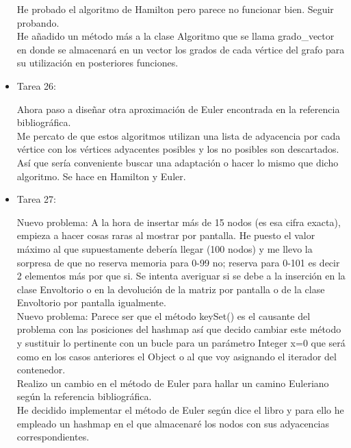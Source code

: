 \begin{itemize}
He probado el algoritmo de Hamilton pero parece no funcionar bien. Seguir probando.\\

He añadido un método más a la clase Algoritmo que se llama grado\_vector en donde se almacenará en un vector los grados de cada vértice del grafo para su utilización en posteriores funciones.\\

\item Tarea 26:

Ahora paso a diseñar otra aproximación de Euler encontrada en la referencia bibliográfica.\\

Me percato de que estos algoritmos utilizan una lista de adyacencia por cada vértice con los vértices adyacentes posibles y los no posibles son descartados. Así que sería conveniente buscar una adaptación o hacer lo mismo que dicho algoritmo. Se hace en Hamilton y Euler.\\

\item Tarea 27:

Nuevo problema: A la hora de insertar más de 15 nodos (es esa cifra exacta), empieza a hacer cosas raras al mostrar por pantalla. He puesto el valor máximo al que supuestamente debería llegar (100 nodos) y me llevo la sorpresa de que no reserva memoria para 0-99 no; reserva para 0-101 es decir 2 elementos más por que si. Se intenta averiguar si se debe a la inserción en la clase Envoltorio o en la devolución de la matriz por pantalla o de la clase Envoltorio por pantalla igualmente.\\

Nuevo problema: Parece ser que el método keySet() es el causante del problema con las posiciones del hashmap así que decido cambiar este método y sustituir lo pertinente con un bucle para un parámetro Integer x=0 que será como en los casos anteriores el Object o al que voy asignando el iterador del contenedor.\\

Realizo un cambio en el método de Euler para hallar un camino Euleriano según la referencia bibliográfica.\\



He decidido implementar el método de Euler según dice el libro y para ello he empleado un hashmap en el que almacenaré los nodos con sus adyacencias correspondientes.\\


\end{itemize}
